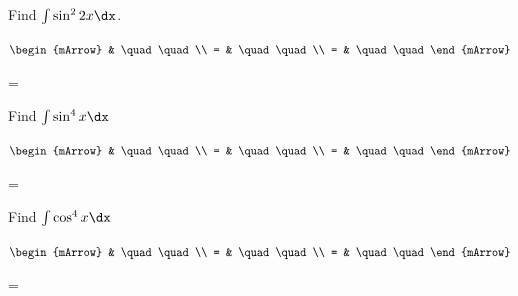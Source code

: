 \begin{mtask}
	 
   \task \begin{exercise} Find $\int \sin^{2}{2x} \dx$.
           \begin{envSolution}
             $\begin{mArrow}
                   & \quad \quad              \\
		   		 = & \quad \quad              \\
				 = & \quad \quad 
              \end{mArrow}$
            \begin{shortsolution}  
			     =$ \quad \quad \quad \quad$
			\end{shortsolution}				 
           \end{envSolution}
         \end{exercise}

   \task \begin{exercise} Find $\int \sin^4{x} \dx$
           \begin{envSolution}[height=12cm]
             $\begin{mArrow}
                   & \quad \quad              \\
		   		 = & \quad \quad              \\
				 = & \quad \quad 
              \end{mArrow}$
            \begin{shortsolution}  
			     =$ \quad \quad \quad \quad$
			\end{shortsolution}				 
           \end{envSolution}
         \end{exercise}

   \task \begin{exercise} Find $\int \cos^4{x} \dx$
           \begin{envSolution}[height=12cm]
             $\begin{mArrow}
                   & \quad \quad              \\
		   		 = & \quad \quad              \\
				 = & \quad \quad 
              \end{mArrow}$
            \begin{shortsolution}  
			     =$ \quad \quad \quad \quad$
			\end{shortsolution}				 
           \end{envSolution}
         \end{exercise}

\end{mtask}



